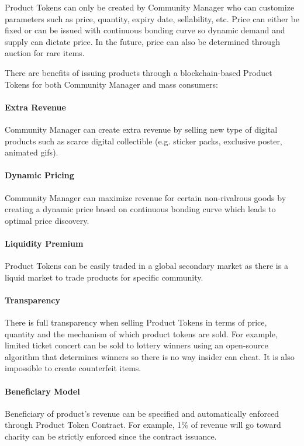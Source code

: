 \documentclass[letterpaper,11pt]{article}
\begin{document}
Product Tokens can only be created by Community Manager who can customize parameters such as price, quantity, expiry date, sellability, etc. Price can either be fixed or can be issued with continuous bonding curve so dynamic demand and supply can dictate price. In the future, price can also be determined through auction for rare items.

There are benefits of issuing products through a blockchain-based Product Tokens for both Community Manager and mass consumers:

\paragraph{Extra Revenue} Community Manager can create extra revenue by selling new type of digital products such as scarce digital collectible (e.g. sticker packs, exclusive poster, animated gifs).

\paragraph{Dynamic Pricing} Community Manager can maximize revenue for certain non-rivalrous goods by creating a dynamic price based on continuous bonding curve which leads to optimal price discovery.

\paragraph{Liquidity Premium} Product Tokens can be easily traded in a global secondary market as there is a liquid market to trade products for specific community.

\paragraph{Transparency} There is full transparency when selling Product Tokens in terms of price, quantity and the mechanism of which product tokens are sold. For example, limited ticket concert can be sold to lottery winners using an open-source algorithm that determines winners so there is no way insider can cheat. It is also impossible to create counterfeit items.

\paragraph{Beneficiary Model} Beneficiary of product's revenue can be specified and automatically enforced through Product Token Contract. For example, 1\% of revenue will go toward charity can be strictly enforced since the contract issuance.
\end{document}
